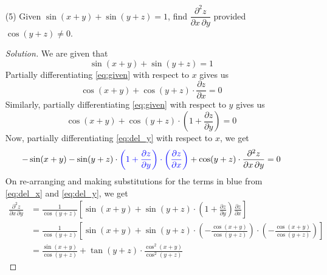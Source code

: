 \documentclass[12pt]{article}
\theoremstyle{definition}
\newenvironment{soln}{\begin{proof}[Solution]}{\end{proof}}
\begin{document}
\begin{enumerate}[leftmargin=*]
    \begin{soln}
        Let $S(x,y,z) \vcentcolon= x^2 + y^2 + z^2$ for $(x,y,z) \in \mathbb{R}^3$. We get that $\left( \nabla S \right)(x_0, y_0, z_0) = 2\left( x_0, y_0, z_0 \right)$. That is, the direction of the outward normal to a sphere at a point on the sphere is the direction of the vector joining the center of the sphere to the point. Thus, the required \emph{unit} vector $\underline{u}$ is 
        \[
            \underline{u} = \frac{1}{3} \left( 2,2,1 \right)
        \]
        The gradient of $F$ (at $(2,2,1)$) can be calculated as
        \[
            \nabla F(2,2,1) = \begin{bmatrix}
            3 & -5 & 2
            \end{bmatrix}
        \]
        Since $F$ is differentiable, we have
        \[
            \nabla_{\underline{u}} F(2,2,1) = \left( \nabla F(2,2,1) \right) \cdot \underline{u} = -\frac{2}{3}
        \]
    \end{soln}
    
    \newpage
    
    \item[(5)] Given $\sin{\left(x+y\right)} + \sin{\left( y+z \right)} = 1$, find $\dfrac{\partial^2 z}{\partial x \, \partial y}$ provided $\cos{\left(y+z\right)} \neq 0$.
    
    \begin{soln}
        We are given that 
        \[
            \sin(x+y) + \sin(y+z) = 1 \label{eq:given} \tag{$\star$}
        \]
        Partially differentiating \eqref{eq:given} with respect to $x$ gives us
        \[
            \cos(x+y) + \cos(y+z) \cdot \frac{\partial z}{\partial x} = 0 \label{eq:del_x} \tag{\textdagger}
        \]
        Similarly, partially differentiating \eqref{eq:given} with respect to $y$ gives us
        \[
            \cos(x+y) + \cos(y+z) \cdot \left( 1 + \frac{\partial z}{\partial y} \right) = 0 \label{eq:del_y} \tag{\textdaggerdbl}
        \]
        Now, partially differentiating \eqref{eq:del_y} with respect to $x$, we get
        \[
            -\sin(x+y) - \sin(y+z) \cdot \textcolor{blue}{\left( 1 + \frac{\partial z}{\partial y} \right) \cdot \left( \frac{\partial z}{\partial x} \right)} + \cos(y+z) \cdot \frac{\partial^2 z}{\partial x \, \partial y} = 0
        \]
        On re-arranging and making substitutions for the terms in blue from \eqref{eq:del_x} and \eqref{eq:del_y}, we get
        \begin{align*}
            \frac{\partial^2 z}{\partial x \, \partial y} &= \frac{1}{\cos(y+z)} \left[  \sin(x+y) + \sin(y+z) \cdot \left( 1 + \frac{\partial z}{\partial y} \right) \frac{\partial z}{\partial x} \right] \\
            &= \frac{1}{\cos(y+z)} \left[  \sin(x+y) + \sin(y+z) \cdot \left( - \frac{\cos(x+y)}{\cos(y+z)} \right) \cdot \left( - \frac{\cos(x+y)}{\cos(y+z)} \right)\right] \\
            &= \boxed{\frac{\sin(x+y)}{\cos(y+z)} + \tan(y+z) \cdot \frac{\cos^2(x+y)}{\cos^2(y+z)}}
        \end{align*}
    \end{soln}
    

\end{enumerate}
\end{document}
